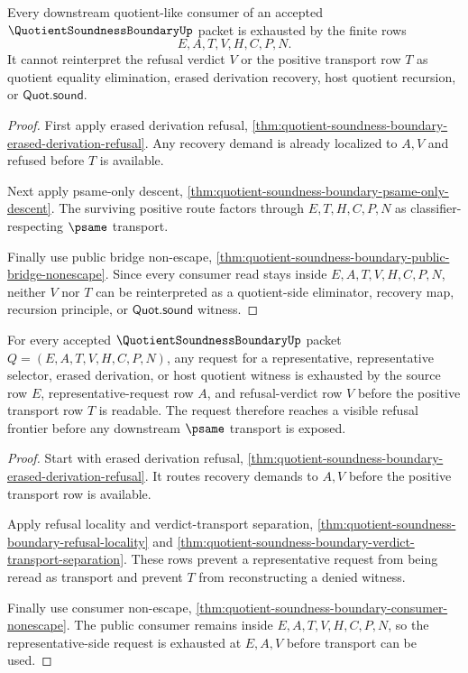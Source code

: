 \begin{theorem}
\label{thm:quotient-soundness-boundary-consumer-nonescape}
Every downstream quotient-like consumer of an accepted $\QuotientSoundnessBoundaryUp$ packet is exhausted by the finite rows
$$
E,A,T,V,H,C,P,N.
$$
It cannot reinterpret the refusal verdict $V$ or the positive transport row $T$ as quotient equality elimination, erased derivation recovery, host quotient recursion, or $\mathsf{Quot.sound}$.
\end{theorem}
\begin{proof}
First apply erased derivation refusal, \autoref{thm:quotient-soundness-boundary-erased-derivation-refusal}. Any recovery demand is already localized to $A,V$ and refused before $T$ is available.

Next apply psame-only descent, \autoref{thm:quotient-soundness-boundary-psame-only-descent}. The surviving positive route factors through $E,T,H,C,P,N$ as classifier-respecting $\psame$ transport.

Finally use public bridge non-escape, \autoref{thm:quotient-soundness-boundary-public-bridge-nonescape}. Since every consumer read stays inside $E,A,T,V,H,C,P,N$, neither $V$ nor $T$ can be reinterpreted as a quotient-side eliminator, recovery map, recursion principle, or $\mathsf{Quot.sound}$ witness.
\end{proof}

\begin{theorem}
\label{thm:quotient-soundness-boundary-representative-request-frontier}
For every accepted $\QuotientSoundnessBoundaryUp$ packet $Q=(E,A,T,V,H,C,P,N)$, any request for a representative, representative selector, erased derivation, or host quotient witness is exhausted by the source row $E$, representative-request row $A$, and refusal-verdict row $V$ before the positive transport row $T$ is readable. The request therefore reaches a visible refusal frontier before any downstream $\psame$ transport is exposed.
\end{theorem}
\begin{proof}
Start with erased derivation refusal, \autoref{thm:quotient-soundness-boundary-erased-derivation-refusal}. It routes recovery demands to $A,V$ before the positive transport row is available.

Apply refusal locality and verdict-transport separation, \autoref{thm:quotient-soundness-boundary-refusal-locality} and \autoref{thm:quotient-soundness-boundary-verdict-transport-separation}. These rows prevent a representative request from being reread as transport and prevent $T$ from reconstructing a denied witness.

Finally use consumer non-escape, \autoref{thm:quotient-soundness-boundary-consumer-nonescape}. The public consumer remains inside $E,A,T,V,H,C,P,N$, so the representative-side request is exhausted at $E,A,V$ before transport can be used.
\end{proof}

